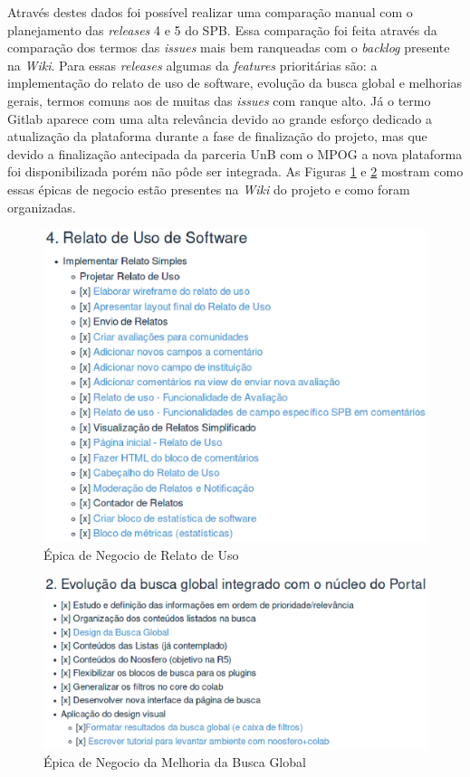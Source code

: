 Através destes dados foi possível realizar uma comparação manual com o planejamento das \textit{releases} 4 e 5 do SPB. Essa comparação foi feita através da comparação dos termos das \textit{issues} mais bem ranqueadas com o \textit{backlog} presente na \textit{Wiki}. Para essas \textit{releases} algumas da \textit{features} prioritárias são: a implementação do relato de uso de software, evolução da busca global e melhorias gerais, termos comuns aos de muitas das \textit{issues} com ranque alto.  Já o termo Gitlab aparece com uma alta relevância devido ao grande esforço dedicado a atualização da plataforma durante a fase de finalização do projeto, mas que devido a finalização antecipada da parceria UnB com o MPOG a nova plataforma foi disponibilizada porém não pôde ser integrada. As Figuras \ref{fig:relato} e \ref{fig:busca} mostram como essas épicas de negocio estão presentes na \textit{Wiki} do projeto e como foram organizadas.

\begin{figure}[!h]
    \centering
        \includegraphics[keepaspectratio=true,scale=0.5]{figuras/relato.eps}
    \caption{Épica de Negocio de Relato de Uso}
    \label{fig:relato}
\end{figure}

\begin{figure}[!h]
    \centering
        \includegraphics[keepaspectratio=true,scale=0.5]{figuras/busca.eps}
    \caption{Épica de Negocio da Melhoria da Busca Global}
    \label{fig:busca}
\end{figure}

